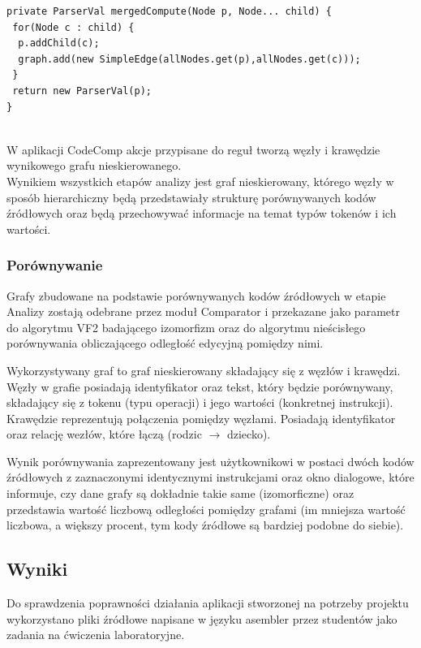 \documentclass[a4paper,12pt,twoside]{article}
\begin{document}
\begin{lstlisting}[caption={Funkcja pomocnicza parsera.}, label={lst:help}]
private ParserVal mergedCompute(Node p, Node... child) {
 for(Node c : child) {
  p.addChild(c);
  graph.add(new SimpleEdge(allNodes.get(p),allNodes.get(c)));
 }
 return new ParserVal(p);
}
\end{lstlisting}
\\

W aplikacji CodeComp akcje przypisane do reguł tworzą węzły i krawędzie wynikowego grafu nieskierowanego.
\\

Wynikiem wszystkich etapów analizy jest graf nieskierowany, którego węzły w sposób hierarchiczny będą przedstawiały strukturę porównywanych kodów źródłowych oraz będą przechowywać informacje na temat typów tokenów i ich wartości.

\subsubsection{Porównywanie}

Grafy zbudowane na podstawie porównywanych kodów źródłowych w etapie Analizy zostają odebrane przez moduł Comparator i przekazane jako parametr do algorytmu VF2 badającego izomorfizm oraz do algorytmu nieścisłego porównywania obliczającego odległość edycyjną pomiędzy nimi.

Wykorzystywany graf to graf nieskierowany składający się z węzłów i krawędzi. Węzły w grafie posiadają identyfikator oraz tekst, który będzie porównywany, składający się z tokenu (typu operacji) i jego wartości (konkretnej instrukcji). Krawędzie reprezentują połączenia pomiędzy węzłami. Posiadają identyfikator oraz relację wezłów, które łączą (rodzic $\rightarrow$ dziecko).

Wynik porównywania zaprezentowany jest użytkownikowi w postaci dwóch kodów źródłowych z zaznaczonymi identycznymi instrukcjami oraz okno dialogowe, które informuje, czy dane grafy są dokładnie takie same (izomorficzne) oraz przedstawia wartość liczbową odległości pomiędzy grafami (im mniejsza wartość liczbowa, a większy procent, tym kody źródłowe są bardziej podobne do siebie).

\newpage

\subsection{Wyniki}

Do sprawdzenia poprawności działania aplikacji stworzonej na potrzeby projektu wykorzystano pliki źródłowe napisane w języku asembler przez studentów jako zadania na ćwiczenia laboratoryjne.
\end{document}
